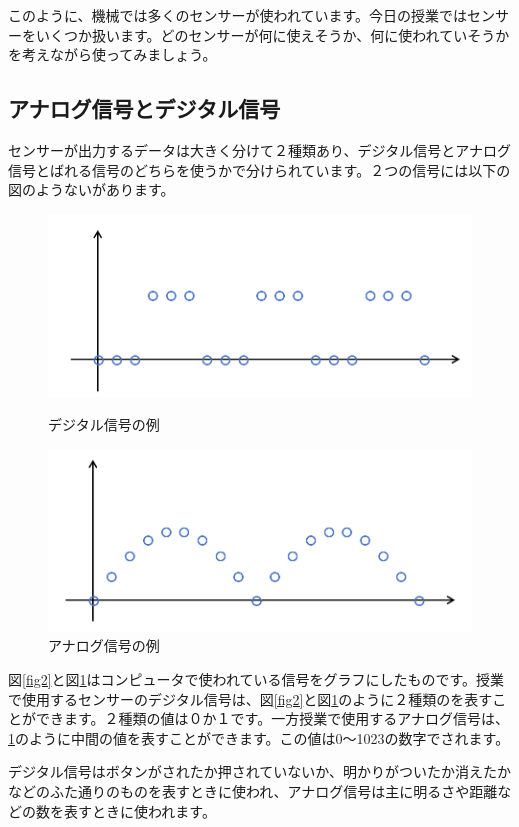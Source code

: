このように、機械では多くのセンサーが使われています。今日の授業ではセンサーをいくつか扱います。どのセンサーが何に使えそうか、何に使われていそうかを考えながら使ってみましょう。

\subsection{アナログ信号とデジタル信号}
センサーが出力するデータは大きく分けて２種類あり、デジタル信号とアナログ信号とばれる信号のどちらを使うかで分けられています。２つの信号には以下の図のようないがあります。
\begin{figure}[htbp]
  \begin{minipage}[b]{0.5\linewidth}
    \centering
    \includegraphics[keepaspectratio, scale=0.5]{images/chap05/text05-img002.png}
    \caption{デジタル信号の例}
    \label{fig2}
  \end{minipage}
  \begin{minipage}[b]{0.5\linewidth}
    \centering
    \includegraphics[keepaspectratio, scale=0.5]{images/chap05/text05-img003.png}
    \caption{アナログ信号の例}
    \label{fig3}
  \end{minipage}
\end{figure}

図\ref{fig2}と図\ref{fig3}はコンピュータで使われている信号をグラフにしたものです。授業で使用するセンサーのデジタル信号は、図\ref{fig2}と図\ref{fig3}のように２種類のを表すことができます。２種類の値は０か１です。一方授業で使用するアナログ信号は、\ref{fig3}のように中間の値を表すことができます。この値は0〜1023の数字でされます。

デジタル信号はボタンがされたか押されていないか、明かりがついたか消えたかなどのふた通りのものを表すときに使われ、アナログ信号は主に明るさや距離などの数を表すときに使われます。

\begin{tcolorbox}[title=\useOmetoi]
  \begin{enumerate}
\end{enumerate}
\end{tcolorbox}

